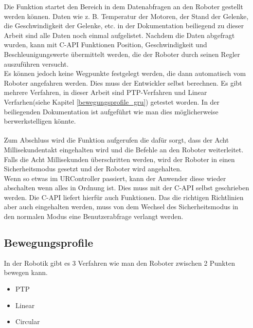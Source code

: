 Die Funktion  startet den Bereich in dem Datenabfragen an den Roboter gestellt werden können. Daten wie z. B. Temperatur der Motoren, der Stand der Gelenke, die Geschwindigkeit der Gelenke, etc. in der Dokumentation beiliegend zu dieser Arbeit sind alle Daten noch einmal aufgelistet. Nachdem die Daten abgefragt wurden, kann mit C-\acs{API} Funktionen Position, Geschwindigkeit und Beschleunigungswerte übermittelt werden, die der Roboter durch seinen Regler auszuführen versucht.\\
Es können jedoch keine Wegpunkte festgelegt werden, die dann automatisch vom Roboter angefahren werden. Dies muss der Entwickler selbst 
berechnen. 
Es gibt mehrere Verfahren, in dieser Arbeit sind \ac{PTP}-Verfahren und Linear Verfarhen(siehe Kapitel \ref{bewegungsprofile_gru}) getestet worden. In der beiliegenden Dokumentation ist aufgeführt wie man dies möglicherweise berwerkstelligen könnte.
\\\\
Zum Abschluss wird die Funktion  aufgerufen die dafür sorgt, dass der Acht Millisekundentakt eingehalten wird und die Befehle an den Roboter weiterleitet. Falls die Acht Millisekunden überschritten werden, wird der Roboter in einen Sicherheitsmodus gesetzt und der Roboter wird angehalten.
\\
Wenn so etwas im URController passiert, kann der Anwender diese wieder abschalten wenn alles in Ordnung ist. Dies muss mit der C-\acs{API} selbst geschrieben werden. Die C-\acs{API} liefert hierfür auch Funktionen. Das die richtigen Richtlinien aber auch eingehalten werden, muss von dem Wechsel des Sicherheitsmodus in den normalen Modus eine Benutzerabfrage verlangt werden.

\subsection{Bewegungsprofile}
\label{sub:bewegungsprofile_gru}

In der Robotik gibt es 3 Verfahren wie man den Roboter zwischen 2 Punkten bewegen kann. 

\begin{itemize}
\item \ac{PTP}
\item Linear
\item Circular
\end{itemize}

